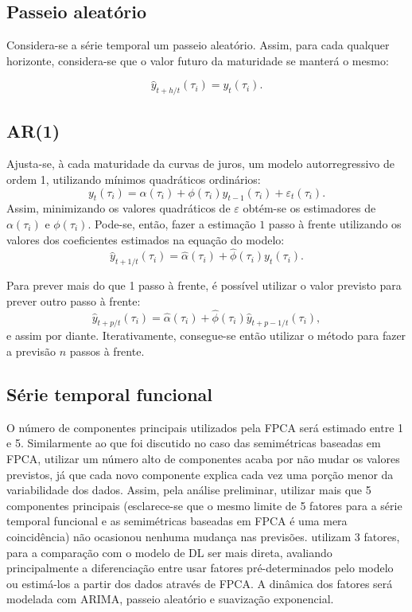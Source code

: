 \documentclass[
	12pt,				%
	openright,			%
	oneside,			%
	a4paper,			%
	english,			%
	brazil				%
	]{dissertacao-ufrgs-abntex2}
\begin{document}
\subsection{Passeio aleatório}
Considera-se a série temporal um passeio aleatório. Assim, para cada qualquer horizonte, considera-se que o valor futuro da maturidade se manterá o mesmo:

\begin{equation}
\hat{y}_{t+h/t}(\tau_i)=y_t(\tau_i).
\end{equation}


\subsection{AR(1)}
Ajusta-se, à cada maturidade da curvas de juros, um modelo autorregressivo de ordem 1, utilizando mínimos quadráticos ordinários:
$$y_t(\tau_i)=\alpha(\tau_i) + \phi(\tau_i) y_{t-1}(\tau_i)+\varepsilon_{t}(\tau_i).$$
Assim, minimizando os valores quadráticos de $\varepsilon$ obtém-se os estimadores de $\alpha(\tau_i)$ e $\phi(\tau_i)$.
Pode-se, então, fazer a estimação $1$ passo à frente utilizando os valores dos coeficientes estimados na equação do modelo:
\begin{equation}
\hat{y}_{t+1/t}(\tau_i)=\hat{\alpha}(\tau_i) + \hat{\phi}(\tau_i) y_t(\tau_i).
\end{equation}

Para prever mais do que 1 passo à frente, é possível utilizar o valor previsto para prever outro passo à frente:
\begin{equation}
\hat{y}_{t+p/t}(\tau_i)=\hat{\alpha}(\tau_i) + \hat{\phi}(\tau_i) \hat{y}_{t+p-1/t}(\tau_i),
\end{equation}
e assim por diante. Iterativamente, consegue-se então utilizar o método para fazer a previsão $n$ passos à frente.

\subsection{Série temporal funcional}

O número de componentes principais utilizados pela FPCA será estimado entre 1 e 5. Similarmente ao que foi discutido no caso das semimétricas baseadas em FPCA, utilizar um número alto de componentes acaba por não mudar os valores previstos, já que cada novo componente explica cada vez uma porção menor da variabilidade dos dados. Assim, pela análise preliminar, utilizar mais que 5 componentes principais (esclarece-se que o mesmo limite de 5 fatores para a série temporal funcional e as semimétricas baseadas em FPCA é uma mera coincidência) não ocasionou nenhuma mudança nas previsões.  utilizam 3 fatores, para a comparação com o modelo de DL ser mais direta, avaliando principalmente a diferenciação entre usar fatores pré-determinados pelo modelo ou estimá-los a partir dos dados através de FPCA.
A dinâmica dos fatores será modelada com ARIMA, passeio aleatório e suavização exponencial.
\end{document}
